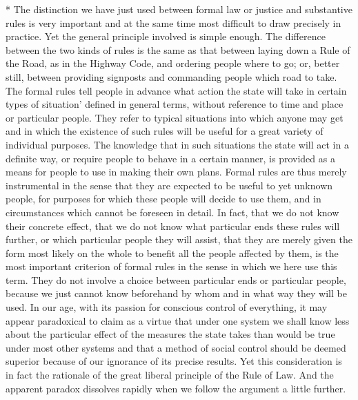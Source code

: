 \documentclass[11pt,openany]{book}
\begin{document}
* The distinction we have just used between formal law or justice and substantive rules is very important and at the same time most difficult to draw precisely in practice. Yet the general principle involved is simple enough. The difference between the two kinds of rules is the same as that between laying down a Rule of the Road, as in the Highway Code, and ordering people where to go; or, better still, between providing signposts and commanding people which road to take. The formal rules tell people in advance what action the state will take in certain types of situation' defined in general terms, without reference to time and place or particular people. They refer to typical situations into which anyone may get and in which the existence of such rules will be useful for a great variety of individual purposes. The knowledge that in such situations the state will act in a definite way, or require people to behave in a certain manner, is provided as a means for people to use in making their own plans. Formal rules are thus merely instrumental in the sense that they are expected to be useful to yet unknown people, for purposes for which these people will decide to use them, and in circumstances which cannot be foreseen in detail. In fact, that we do not know their concrete effect, that we do not know what particular ends these rules will further, or which particular people they will assist, that they are merely given the form most likely on the whole to benefit all the people affected by them, is the most important criterion of formal rules in the sense in which we here use this term. They do not involve a choice between particular ends or particular people, because we just cannot know beforehand by whom and in what way they will be used. In our age, with its passion for conscious control of everything, it may appear paradoxical to claim as a virtue that under one system we shall know less about the particular effect of the measures the state takes than would be true under most other systems and that a method of social control should be deemed superior because of our ignorance of its precise results. Yet this consideration is in fact the rationale of the great liberal principle of the Rule of Law. And the apparent paradox dissolves rapidly when we follow the argument a little further.

\begin{center}\textasteriskcentered\hspace{0.9em}\textasteriskcentered\hspace{0.9em}\textasteriskcentered\end{center}
\end{document}
